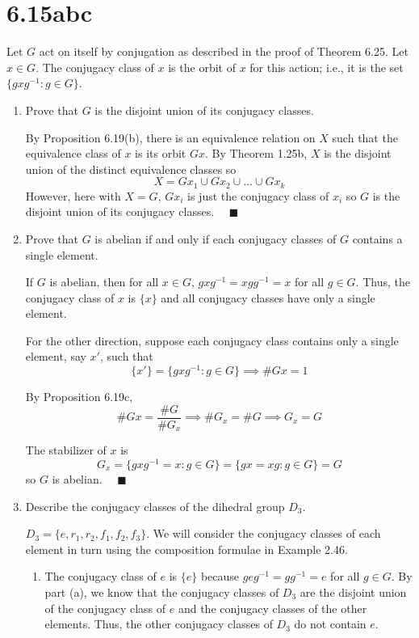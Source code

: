 \documentclass[12pt]{article}
\newcommand{\qed}{\quad \blacksquare}
\begin{document}
\pagebreak
\section*{6.15abc} 
Let $G$ act on itself by conjugation as described in the proof of Theorem 6.25. Let $x \in G$. The conjugacy class of $x$ is the orbit of $x$ for this action; i.e., it is the set $\{gxg^{-1} : g \in G\}$.
\begin{enumerate}
    \item Prove that $G$ is the disjoint union of its conjugacy classes.
    
        \color{blue}
            By Proposition 6.19(b), there is an equivalence relation on $X$ such that the equivalence class of $x$ is its orbit $Gx$. By Theorem 1.25b, $X$ is the disjoint union of the distinct equivalence classes so
            \[X = Gx_1 \cup Gx_2 \cup \dots \cup Gx_k\]
            However, here with $X = G$, $Gx_i$ is just the conjugacy class of $x_i$ so $G$ is the disjoint union of its conjugacy classes. $\qed$
        \color{black}

    \item Prove that $G$ is abelian if and only if each conjugacy classes of $G$ contains a single element.

        \color{blue}
            If $G$ is abelian, then for all $x \in G$, $gxg^{-1} = xgg^{-1} = x$ for all $g \in G$. Thus, the conjugacy class of $x$ is $\{x\}$ and all conjugacy classes have only a single element. 

            For the other direction, suppose each conjugacy class contains only a single element, say $x'$, such that 
            \[\{x'\} = \{gxg^{-1} : g \in G\} \implies \#Gx = 1\]
            
            By Proposition 6.19c, 
            \[\#Gx = \frac{\#G}{\#G_x} \implies \#G_x = \#G \implies G_x = G\]

            The stabilizer of $x$ is  
            \[G_x = \{gxg^{-1} = x: g \in G\} = \{gx = xg: g \in G\} = G\]
            so $G$ is abelian. $\qed$
        \color{black}

    \item Describe the conjugacy classes of the dihedral group $D_3$.
    
        \color{blue}
            $D_3 = \{e, r_1, r_2, f_1, f_2, f_3\}$. We will consider the conjugacy classes of each element in turn using the composition formulae in Example 2.46.
            \begin{multicols}{2}
                \begin{enumerate}
                    \item The conjugacy class of $e$ is $\{e\}$ because $geg^{-1} = gg^{-1} = e$ for all $g \in G$. By part (a), we know that the conjugacy classes of $D_3$ are the disjoint union of the conjugacy class of $e$ and the conjugacy classes of the other elements. Thus, the other conjugacy classes of $D_3$ do not contain $e$. 
                    

\end{enumerate}
\end{multicols}
\end{enumerate}
\end{document}
